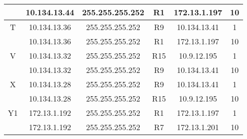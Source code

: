 \documentclass[12pt, a4paper, spanish]{article}
\begin{document}
\begin{center}
\begin{tabular}{|c|c|c|c|c|c|}
	 & 10.134.13.44 & 255.255.255.252 & R1 & 172.13.1.197 & 10\\
	\hline
	T & 10.134.13.36 & 255.255.255.252 & R9 & 10.134.13.41 & 1\\
	 & 10.134.13.36 & 255.255.255.252 & R1 & 172.13.1.197 & 10\\
	\hline
	V & 10.134.13.32 & 255.255.255.252 & R15 & 10.9.12.195 & 1\\
	 & 10.134.13.32 & 255.255.255.252 & R9 & 10.134.13.41 & 10\\
	\hline
	X & 10.134.13.28 & 255.255.255.252 & R9 & 10.134.13.41 & 1\\
	 & 10.134.13.28 & 255.255.255.252 & R15 & 10.9.12.195 & 10\\
	\hline
	Y1 & 172.13.1.192 & 255.255.255.252 & R1 & 172.13.1.197 & 1\\
	 & 172.13.1.192 & 255.255.255.252 & R7 & 172.13.1.201 & 10\\
	\hline
\end{tabular}
\end{center}
\end{document}
